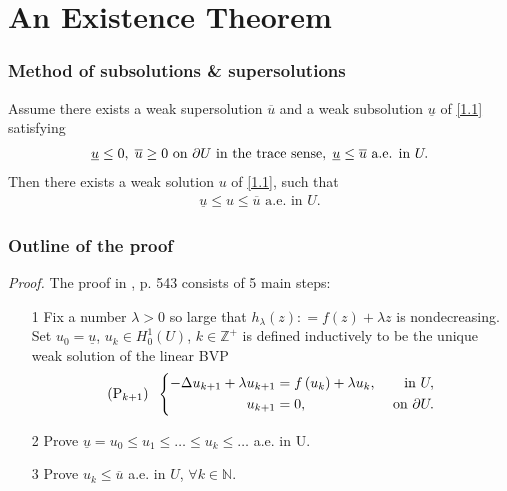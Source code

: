 \documentclass{beamer}
\begin{document}
\section{An Existence Theorem}

\begin{frame}
\frametitle{Method of subsolutions \& supersolutions}
\begin{theorem}\label{theorem1.1}
Assume there exists a weak supersolution $\overline{u}$ and a weak subsolution $\underline{u}$ of \eqref{1.1} satisfying
\begin{align}
\label{1.8}
\underline u  \le 0,\hspace{1mm}\overline u  \ge 0 \mbox{ on } \partial U \mbox{ in the trace sense}, \hspace{1mm}\underline u  \le \overline u \mbox{ a.e. in } U.
\end{align}
Then there exists a weak solution $u$ of \eqref{1.1}, such that 
\begin{align}
\underline{u} \le u\le \overline{u} \mbox{ a.e. in } U.
\end{align}
\end{theorem}

\end{frame}

\begin{frame}
\frametitle{Outline of the proof}
\textit{Proof.} The proof in \cite{Evans2010}, p. 543 consists of 5 main steps: 
\begin{enumerate}
\item[1] Fix a number $\lambda >0$ so large that ${h_\lambda }\left( z \right): = f\left( z \right) + \lambda z$ is nondecreasing. Set $u_0=\underline{u}$, $u_k \in H_0^1\left(U\right)$, $k\in \mathbb{Z}^+$ is defined inductively to be the unique weak solution of the linear BVP
\begin{equation}
\label{1.11}
\left({\rm P}_{k+1} \right) \hspace{2mm} \left\{ \begin{split}
 - \Delta {u_{k + 1}} + \lambda {u_{k + 1}} &= f\left( {{u_k}} \right) + \lambda {u_k}, & \mbox{ in } U,\\
{u_{k + 1}} &= 0, & \mbox{ on } \partial U.
\end{split} \right.
\end{equation}
\item[2] Prove $\underline{u} = u_0 \le u_1 \le \ldots \le u_k\le \ldots$  a.e. in U.
\item[3] Prove $u_k\le \overline{u}$ a.e. in $U$, $\forall k\in \mathbb{N}$.


\end{enumerate}
\end{frame}
\end{document}
